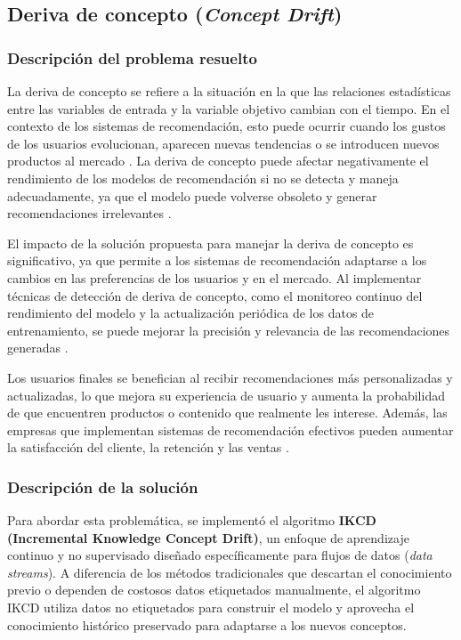 \documentclass[12pt]{article}
\begin{document}
\subsection{Deriva de concepto (\textit{Concept Drift})}

\subsubsection{Descripción del problema resuelto}
La deriva de concepto se refiere a la situación en la que las relaciones estadísticas entre las variables de entrada y la variable objetivo cambian con el tiempo. En el contexto de los sistemas de recomendación, esto puede ocurrir cuando los gustos de los usuarios evolucionan, aparecen nuevas tendencias o se introducen nuevos productos al mercado \cite{wanas2019detection}. La deriva de concepto puede afectar negativamente el rendimiento de los modelos de recomendación si no se detecta y maneja adecuadamente, ya que el modelo puede volverse obsoleto y generar recomendaciones irrelevantes \cite{wanas2019detection}.

El impacto de la solución propuesta para manejar la deriva de concepto es significativo, ya que permite a los sistemas de recomendación adaptarse a los cambios en las preferencias de los usuarios y en el mercado. Al implementar técnicas de detección de deriva de concepto, como el monitoreo continuo del rendimiento del modelo y la actualización periódica de los datos de entrenamiento, se puede mejorar la precisión y relevancia de las recomendaciones generadas \cite{wanas2019detection}. 

Los usuarios finales se benefician al recibir recomendaciones más personalizadas y actualizadas, lo que mejora su experiencia de usuario y aumenta la probabilidad de que encuentren productos o contenido que realmente les interese. Además, las empresas que implementan sistemas de recomendación efectivos pueden aumentar la satisfacción del cliente, la retención y las ventas \cite{wanas2019detection}.

\subsubsection{Descripción de la solución}
Para abordar esta problemática, se implementó el algoritmo \textbf{IKCD (Incremental Knowledge Concept Drift)}, un enfoque de aprendizaje continuo y no supervisado diseñado específicamente para flujos de datos (\textit{data streams}). A diferencia de los métodos tradicionales que descartan el conocimiento previo o dependen de costosos datos etiquetados manualmente, el algoritmo IKCD utiliza datos no etiquetados para construir el modelo y aprovecha el conocimiento histórico preservado para adaptarse a los nuevos conceptos.
\end{document}

